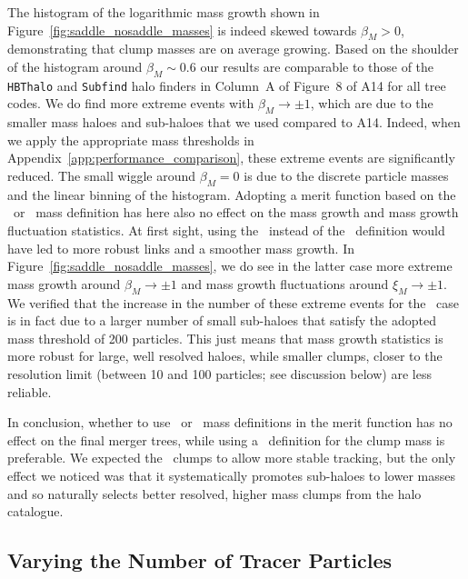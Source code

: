 The histogram of the logarithmic mass growth shown in
Figure~\ref{fig:saddle_nosaddle_masses} is indeed skewed towards
$\beta_M > 0$, demonstrating that clump masses are on average growing.
Based on the shoulder of the histogram around $\beta_M \sim 0.6$ our
results are comparable to those of the \texttt{HBThalo} and \texttt{Subfind}
halo finders in Column~A of Figure~8 of A14 for all tree codes. We do
find more extreme events with $\beta_M \rightarrow \pm 1$, which are
due to the smaller mass haloes and sub-haloes that we used compared
to A14. Indeed, when we apply the appropriate mass thresholds in 
Appendix~\ref{app:performance_comparison}, these extreme events are
significantly reduced. The small wiggle around $\beta_M = 0$ is due to
the discrete particle masses and the linear binning of the histogram.
Adopting a merit function based on the \inc\ or \exc\ mass definition
has here also no effect on the mass growth and mass growth fluctuation
statistics.  At first sight, using the \sad\ instead of the
\nosad\ definition would have led to more robust links and a smoother
mass growth. In Figure~\ref{fig:saddle_nosaddle_masses}, we do see in
the latter case more extreme mass growth around $\beta_M \rightarrow
\pm 1$ and mass growth fluctuations around $\xi_M \rightarrow \pm
1$. We verified that the increase in the number of these extreme
events for the \nosad\ case is in fact due to a larger number of small
sub-haloes that satisfy the adopted mass threshold of 200 particles.
This just means that mass growth statistics is more robust for large,
well resolved haloes, while smaller clumps, closer to the resolution
limit (between 10 and 100 particles; see discussion below) are less
reliable.

In conclusion, whether to use \inc\ or \exc\ mass definitions in the
merit function has no effect on the final merger trees, while using a
\sad\ definition for the clump mass is preferable. We expected the
\sad\ clumps to allow more stable tracking, but the only effect we 
noticed was that it systematically promotes
sub-haloes to lower masses and so naturally selects better resolved, 
higher mass clumps from the halo catalogue.


\subsection{Varying the Number of Tracer Particles} \label{chap:testing-nmb}

